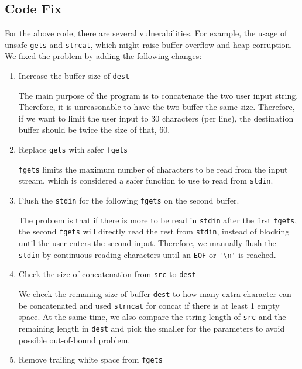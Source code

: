 \documentclass[11pt]{article}
\begin{document}
\subsection{Code Fix} \label{codefix}
For the above code, there are several vulnerabilities. For example, the usage of unsafe \lstinline{gets} and \lstinline{strcat}, which might raise buffer overflow and heap corruption. We fixed the problem by adding the following changes:
\begin{enumerate}
    \item Increase the buffer size of \lstinline{dest} \par
    The main purpose of the program is to concatenate the two user input string. Therefore, it is unreasonable to have the two buffer the same size. Therefore, if we want to limit the user input to 30 characters (per line), the destination buffer should be twice the size of that, 60.
    
    \item Replace \lstinline{gets} with safer \lstinline{fgets} \par
    \lstinline{fgets} limits the maximum number of characters to be read from the input stream, which is considered a safer function to use to read from \lstinline{stdin}. 
    
    \item Flush the \lstinline{stdin} for the following \lstinline{fgets} on the second buffer. \par
    The problem is that if there is more to be read in \lstinline{stdin} after the first \lstinline{fgets}, the second \lstinline{fgets} will directly read the rest from \lstinline{stdin}, instead of blocking until the user enters the second input. Therefore, we manually flush the \lstinline{stdin} by continuous reading characters until an \lstinline{EOF} or \lstinline{'\n'} is reached. 
    
    \item Check the size of concatenation from \lstinline{src} to \lstinline{dest}\par
    We check the remaning size of buffer \lstinline{dest} to how many extra character can be concatenated and used \lstinline{strncat} for concat if there is at least 1 empty space. At the same time, we also compare the string length of \lstinline{src} and the remaining length in \lstinline{dest} and pick the smaller for the parameters to avoid possible out-of-bound problem.
    \item Remove trailing white space from \lstinline{fgets} \par
\end{enumerate}
\end{document}
